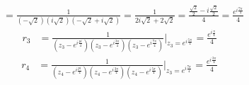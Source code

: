 \documentclass[12pt]{article}
\begin{document}
\begin{enumerate}
\begin{align*}
			     &=\frac{1}{(-\sqrt{2})(i\sqrt{2})(-\sqrt{2}+i\sqrt{2})}=\frac{1}{2i\sqrt{2}+2\sqrt{2}}=\frac{\frac{\sqrt{2}}{2}-i \frac{\sqrt{2}}{2}}{4}=\frac{e^{i \frac{7\pi}{4}}}{4}
		\end{align*}
		\begin{align*}
		    r_{3}&=\frac{1}{(z_{3}-e^{i \frac{pi}{4}})(z_{3}-e^{i \frac{3\pi}{4}})(z_{3}-e^{i \frac{7\pi}{4}})}|_{z_{3} = e^{i \frac{5\pi}{4}}} = \frac{e^{i \frac{\pi}{4}}}{4}	 
		\end{align*}
		\begin{align*}
		    r_{4}&=\frac{1}{(z_{4}-e^{i \frac{pi}{4}})(z_{4}-e^{i \frac{3\pi}{4}})(z_{4}-e^{i \frac{5\pi}{4}})}|_{z_{3} = e^{i \frac{7\pi}{4}}} = \frac{e^{i \frac{3\pi}{4}}}{4}	 
		\end{align*}

\end{enumerate}


\newpage
\end{document}
